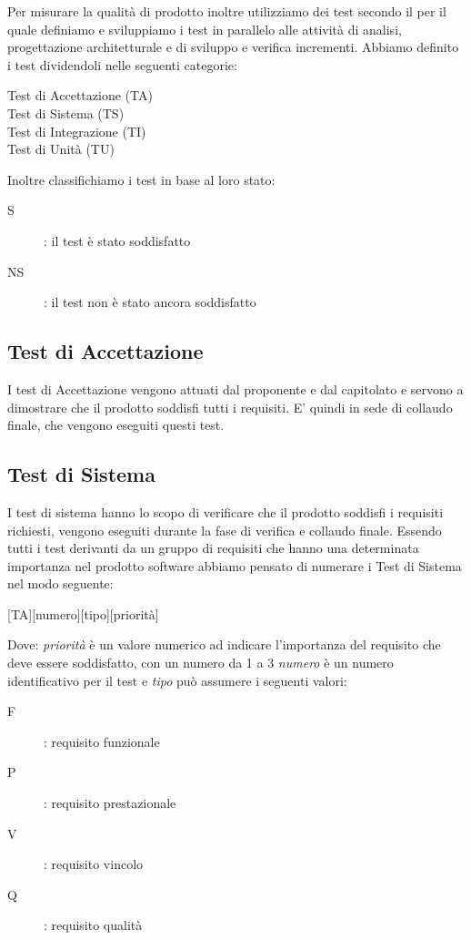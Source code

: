 \documentclass[../piano-di-qualifica.tex]{subfiles}
\begin{document}
\label{sub:test}
    Per misurare la qualità di prodotto inoltre utilizziamo dei test secondo il  per il quale definiamo e sviluppiamo i test in parallelo alle attività di analisi, progettazione architetturale e di sviluppo e verifica incrementi.
    Abbiamo definito i test dividendoli nelle seguenti categorie:
    \begin{description}
      \item [Test di Accettazione (TA)]
      \item [Test di Sistema (TS)]
      \item [Test di Integrazione (TI)]
      \item [Test di Unità (TU)]
    \end{description}
    Inoltre classifichiamo i test in base al loro stato:
      \begin{description}
        \item [S]: il test è stato soddisfatto
        \item [NS]: il test non è stato ancora soddisfatto
      \end{description}
  \subsection{Test di Accettazione}%
      I test di Accettazione vengono attuati dal proponente e dal capitolato e servono a dimostrare che il prodotto soddisfi tutti i requisiti.
      E' quindi in sede di collaudo finale, che vengono eseguiti questi test.
  \subsection{Test di Sistema}%
  \label{subs:accettazione}
      I test di sistema hanno lo scopo di verificare che il prodotto soddisfi i requisiti richiesti, vengono eseguiti durante la fase di verifica e collaudo finale.
      Essendo tutti i test derivanti da un gruppo di requisiti che hanno una determinata importanza nel prodotto software abbiamo pensato di numerare i Test di Sistema nel modo seguente:
      \begin{center}
          [TA][numero][tipo][priorità]
      \end{center}
      Dove: \textit{priorità} è un valore numerico ad indicare l'importanza del requisito che deve essere soddisfatto, con un numero da 1 a 3 \textit{numero} è un numero identificativo per il test e \textit{tipo} può assumere i seguenti valori:
      \begin{description}
        \item [F]: requisito funzionale
        \item [P]: requisito prestazionale
        \item [V]: requisito vincolo
        \item [Q]: requisito qualità
      \end{description}
\end{document}
